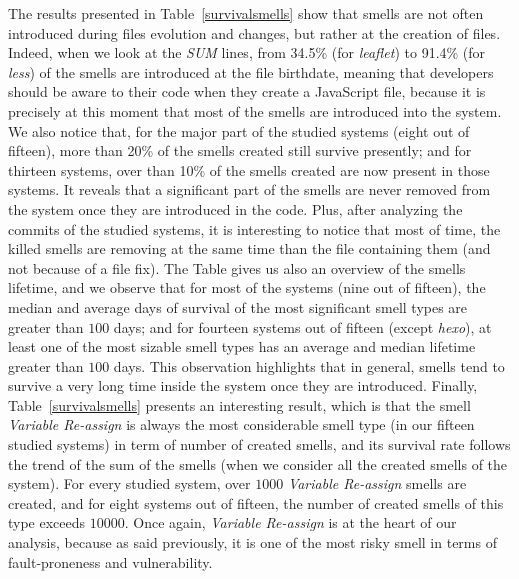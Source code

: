 {The results presented in Table~\ref{survivalsmells} show that smells are not often introduced during files evolution and changes, but rather at the creation of files. Indeed, when we look at the \textsl{SUM} lines, from 34.5\% (for \textsl{leaflet}) to 91.4\% (for \textsl{less}) of the smells are introduced at the file birthdate, meaning that developers should be aware to their code when they create a JavaScript file, because it is precisely at this moment that most of the smells are introduced into the system. We also notice that, for the major part of the studied systems (eight out of fifteen), more than 20\% of the smells created still survive presently; and for thirteen systems, over than 10\% of the smells created are now present in those systems. It reveals that a significant part of the smells are never removed from the system once they are introduced in the code. Plus, after analyzing the commits of the studied systems, it is interesting to notice that most of time, the killed smells are removing at the same time than the file containing them (and not because of a file fix). The Table gives us also an overview of the smells lifetime, and we observe that for most of the systems (nine out of fifteen), the median and average days of survival of the most significant smell types are greater than $100$ days; and for fourteen systems out of fifteen (except \textsl{hexo}), at least one of the most sizable smell types has an average and median lifetime greater than $100$ days. This observation highlights that in general, smells tend to survive a very long time inside the system once they are introduced. Finally, Table~\ref{survivalsmells} presents an interesting result, which is that the smell \textsl{Variable Re-assign} is always the most considerable smell type (in our fifteen studied systems) in term of number of created smells, and its survival rate follows the trend of the sum of the smells (when we consider all the created smells of the system). For every studied system, over $1000$ \textsl{Variable Re-assign} smells are created, and for eight systems out of fifteen, the number of created smells of this type exceeds $10000$. Once again, \textsl{Variable Re-assign} is at the heart of our analysis, because as said previously, it is one of the most risky smell in terms of fault-proneness and vulnerability.
}
